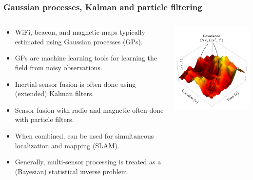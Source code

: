\documentclass[xcolor=svgnames,english,handout]{beamer}
\begin{document}
\begin{frame}
  \frametitle{Gaussian processes, Kalman and particle filtering}

  \begin{columns}
  \begin{column}{0.65\textwidth}
  \begin{itemize}[<+->]       
  \item \alert{WiFi, beacon, and magnetic maps} typically estimated using \alert{Gaussian processes} (GPs).
  \item GPs are \alert{machine learning tools} for \alert{learning} the field from noisy observations.
  \item \alert{Inertial sensor fusion} is often done using \alert{(extended) Kalman filters}.
  \item \alert{Sensor fusion} with \alert{radio and magnetic} often done with \alert{particle filters}.
  \item When combined, can be used for \alert{simultaneous localization and mapping (SLAM)}.
  \item Generally, \alert{multi-sensor processing} is treated as a (Bayesian) \alert{statistical inverse problem}.
  \end{itemize}
  \end{column}
  \begin{column}{0.35\textwidth}
  \includegraphics[width=\columnwidth]{TikZ-covariance-figure} \\

\end{column}
\end{columns}
\end{frame}
\end{document}
